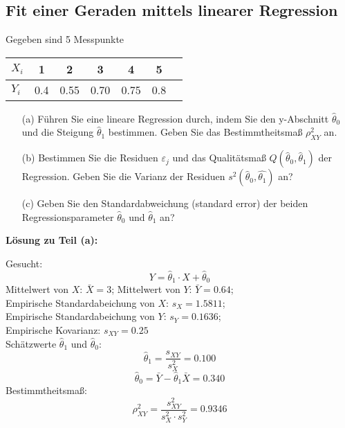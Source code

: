 \subsection{Fit einer Geraden mittels linearer Regression}
Gegeben sind 5 Messpunkte
\begin{table}[htb!]
	\centering
	\begin{tabular}{l|c c c c c c}
		$X_i$ & 1 & 2 & 3 & 4 & 5 \\ \hline
		$Y_i$ & 0.4 & 0.55 & 0.70 & 0.75 & 0.8
	\end{tabular}
\end{table}
\begin{itemize}
	\item [(a)] Führen Sie eine lineare Regression durch, indem
	Sie den y-Abschnitt $\hat\theta_0$ und die Steigung $\hat\theta_1$ bestimmen. Geben Sie das Bestimmtheitsmaß $\rho_{XY}^2$ an.
	\item[(b)] Bestimmen Sie die Residuen $\varepsilon_j$ und das 
	Qualitätsmaß $Q(\hat\theta _0,\hat\theta _1)$ der Regression. Geben Sie die Varianz der Residuen 
	$s^2(\hat\theta_0,\hat{\theta_1})$ an?
	\item[(c)] Geben Sie den Standardabweichung (standard error) der beiden 
	Regressionsparameter $\hat\theta_0$ und $\hat\theta_1$ an?
	
\end{itemize}

\textbf{Lösung zu Teil (a):}

Gesucht: 
\[
Y = \hat\theta_1 \cdot X + \hat \theta_0 
\]
Mittelwert von $X$: $\bar{X} = 3$; Mittelwert von $Y$: $\bar{Y} = 0.64$; \\
Empirische Standardabeichung von $X$: $s_X = 1.5811$; \\
Empirische Standardabeichung von $Y$: $s_Y = 0.1636$; \\
Empirische Kovarianz: $s_{XY} = 0.25$ \\
Schätzwerte $\hat{\theta}_1$ und $\hat{\theta}_0$:
\[
\hat{\theta}_1 = \frac{s_{XY} }{s_X^2 } = 0.100
\]
\[
\hat{\theta}_0 = \bar {Y} - \hat{\theta}_1 \bar {X} = 0.340
\]
Bestimmtheitsmaß:
\[
\rho_{XY}^2 = \frac{s_{XY}^2 }{s_X^2 \cdot s_Y^2 } = 0.9346
\]


